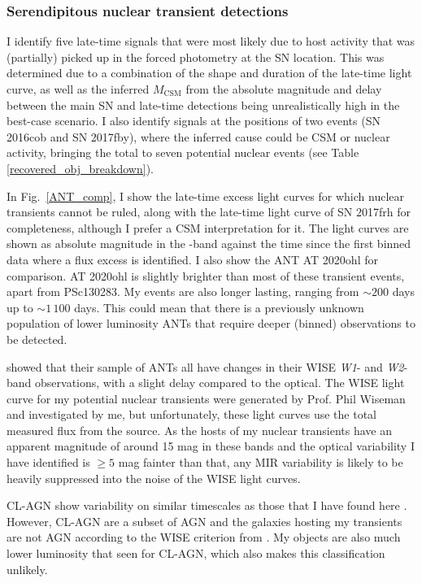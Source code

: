 \documentclass[a4paper,oneside,12pt, class=Latex/Classes/PhDthesisPSnPDF, crop=false]{standalone}
\begin{document}
\subsubsection{Serendipitous nuclear transient detections}
\label{sec:discussion:nuclear}
I identify five late-time signals that were most likely due to host activity that was (partially) picked up in the forced photometry at the SN location. This was determined due to a combination of the shape and duration of the late-time light curve, as well as the inferred $M_\text{CSM}$ from the absolute magnitude and delay between the main SN and late-time detections being unrealistically high in the best-case scenario. I also identify signals at the positions of two events (SN 2016cob and SN 2017fby), where the inferred cause could be CSM or nuclear activity, bringing the total to seven potential nuclear events (see Table \ref{recovered_obj_breakdown}).

In Fig.~\ref{ANT_comp}, I show the late-time excess light curves for which nuclear transients cannot be ruled, along with the late-time light curve of SN 2017frh for completeness, although I prefer a CSM interpretation for it. The light curves are shown as absolute magnitude in the \ztfr-band against the time since the first binned data where a flux excess is identified. I also show the ANT AT 2020ohl \citep{2020ohl_Hinkle} for comparison. AT 2020ohl is slightly brighter than most of these transient events, apart from PSc130283. My events are also longer lasting, ranging from $\sim200$ days up to $\sim1\,100$ days. This could mean that there is a previously unknown population of lower luminosity ANTs that require deeper (binned) observations to be detected.

\citet{wiseman_ztfants} showed that their sample of ANTs all have changes in their WISE \textit{W1}- and \textit{W2}-band observations, with a slight delay compared to the optical. The WISE light curve for my potential nuclear transients were generated by Prof. Phil Wiseman and investigated by me, but unfortunately, these light curves use the total measured flux from the source. As the hosts of my nuclear transients have an apparent magnitude of around 15 mag in these bands and the optical variability I have identified is $\geq5$ mag fainter than that, any MIR variability is likely to be heavily suppressed into the noise of the WISE light curves.

CL-AGN show variability on similar timescales as those that I have found here \citep{CLAGN}. However, CL-AGN are a subset of AGN and the galaxies hosting my transients are not AGN according to the WISE criterion from \citet{WISE_crit}. My objects are also much lower luminosity that seen for CL-AGN, which also makes this classification unlikely.
\end{document}
